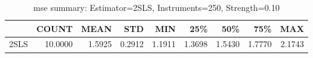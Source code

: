\begin{table}[ht]
\centering
\caption{mse summary: Estimator=2SLS, Instruments=250, Strength=0.10}
\begin{tabular}{lrrrrrrrr}
\toprule
 & COUNT & MEAN & STD & MIN & 25\% & 50\% & 75\% & MAX \\
\midrule
2SLS & 10.0000 & 1.5925 & 0.2912 & 1.1911 & 1.3698 & 1.5430 & 1.7770 & 2.1743 \\
\bottomrule
\end{tabular}
\end{table}
